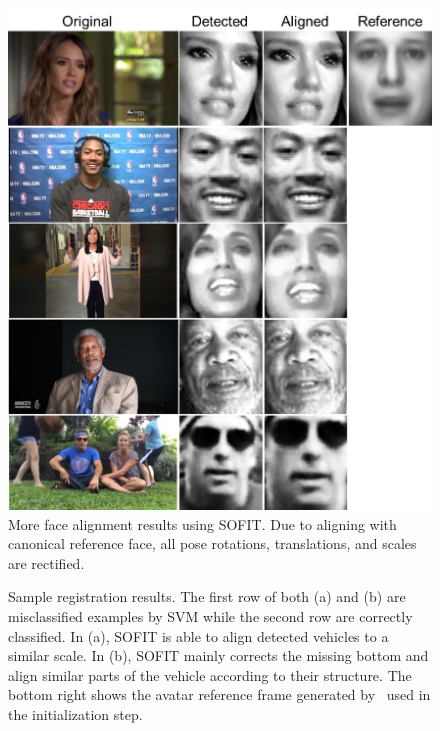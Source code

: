 \documentclass[10pt,journal]{IEEEtran}
\begin{document}
\begin{figure}[htbp]
	\centering
		\includegraphics[width=.8\columnwidth]{fig/suppliment.png}
	\caption{More face alignment results using SOFIT. Due to aligning with canonical reference face, all pose rotations, translations, and scales are rectified. }
	\label{fig:suppliment}
\end{figure}


\begin{figure}[htbp]
	\centering


	\caption{Sample registration results. The first row of both (a) and (b) are misclassified examples by SVM while the second row are correctly classified. In (a), SOFIT is able to align detected vehicles to a similar scale. In (b), SOFIT mainly corrects the missing bottom and align similar parts of the vehicle according to their structure. The bottom right shows the avatar reference frame generated by~\cite{Yang_SMCB12} used in the initialization step.}
	\label{fig:vehicle_reg_sample}
\end{figure}
\end{document}
